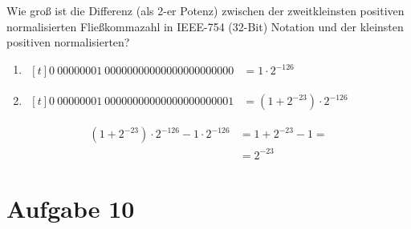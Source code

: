\documentclass[10pt, oneside]{article}
\begin{document}
Wie gro{\ss} ist die Differenz (als 2-er Potenz) zwischen der zweitkleinsten
positiven normalisierten Flie{\ss}kommazahl in IEEE-754 (32-Bit) Notation und
der kleinsten positiven normalisierten?
\begin{enumerate}
    \item $\begin{aligned}[t]
            0\ 00000001\ 00000000000000000000000 &= 1 \cdot 2^{-126}
        \end{aligned}$
    \item $\begin{aligned}[t]
            0\ 00000001\ 00000000000000000000001 &= (1 + 2^{-23}) \cdot 2^{-126}
        \end{aligned}$
\end{enumerate}
\begin{align*}
    (1 + 2^{-23}) \cdot 2^{-126} - 1 \cdot 2^{-126} &= 1 + 2^{-23} - 1 = \\
                                                    &= 2^{-23}
\end{align*}

\section{Aufgabe 10}
\end{document}
